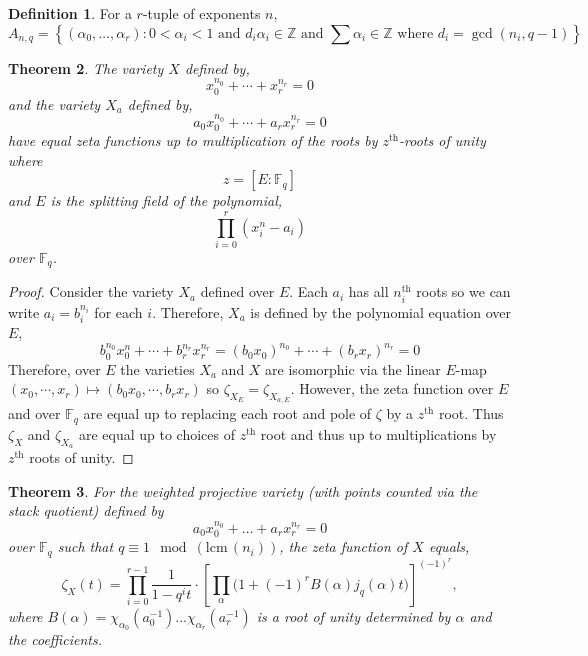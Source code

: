 \documentclass{article}
\newcommand{\Z}{\mathbb{Z}}
\newcommand{\F}{\mathbb{F}}
\newcommand{\lcm}[0]{\mathrm{lcm} \,}
\newtheorem{theorem}{Theorem}[section]
\theoremstyle{definition}
\theoremstyle{definition}
\newtheorem{definition}[theorem]{Definition}
\theoremstyle{remark}
\begin{document}
\begin{definition}
For a $r$-tuple of exponents $n$,
\[ A_{n, q} = \left\{ (\alpha_0, \dots, \alpha_r) : 0 < \alpha_i < 1 \text{ and } d_i \alpha_i \in \Z \text{ and } \sum \alpha_i \in \Z \text{ where } d_i = \gcd{(n_i, q-1)} \right\} \]
\end{definition}

\begin{theorem} \label{thm:change_coeffs}
The variety $X$ defined by,
\[ x_0^{n_0} + \cdots + x_r^{n_r} = 0 \]
and the variety $X_a$ defined by,
\[ a_0 x_0^{n_0} + \cdots + a_r x_r^{n_r} = 0 \]
have equal zeta functions up to multiplication of the roots by $z^{\mathrm{th}}$-roots of unity where \[ z = [E : \F_q] \]
and $E$ is the splitting field of the polynomial,
\[ \prod_{i = 0}^r (x^n_i - a_i) \]
over $\F_q$.
\end{theorem}

\begin{proof}
Consider the variety $X_a$ defined over $E$. Each $a_i$ has all $n_i^{\mathrm{th}}$ roots so we can write $a_i = b_i^{n_i}$ for each $i$. Therefore, $X_a$ is defined by the polynomial equation over $E$,
\[ b_0^{n_0} x^n_0 + \cdots + b_r^{n_r} x_r^{n_r} = (b_0 x_0)^{n_0} + \cdots + (b_r x_r)^{n_r} = 0 \]
Therefore, over $E$ the varieties $X_a$ and $X$ are isomorphic via the linear $E$-map $(x_0, \cdots, x_r) \mapsto (b_0 x_0, \cdots, b_r x_r)$ so $\zeta_{X_E} = \zeta_{X_{a,E}}$. However, the zeta function over $E$ and over $\F_q$ are equal up to replacing each root and pole of $\zeta$ by a $z^{\mathrm{th}}$ root. Thus $\zeta_{X}$ and $\zeta_{X_a}$ are equal up to choices of $z^{\mathrm{th}}$ root and thus up to multiplications by $z^{\mathrm{th}}$ roots of unity. 
\end{proof}

\begin{theorem} \label{thm:decomp_zeta_function}
For the weighted projective variety (with points counted via the stack quotient) defined by 
\[ a_0 x_0^{n_0} + \dots + a_r x_r^{n_r} = 0 \] 
over $\F_q$ such that $q \equiv 1 \mod (\lcm(n_i))$, the zeta function of $X$ equals, 
\[
\zeta_X(t) = \prod_{i = 0}^{r-1} \frac{1}{1 - q^i t} \cdot 
\left[ \prod_{\alpha}  \bigg( 1 + (-1)^r B(\alpha)j_q(\alpha)t \bigg) \right]^{(-1)^{r}},
\] 
where $B(\alpha) = \chi_{\alpha_0}(a_0^{-1}) \dots \chi_{\alpha_r}(a_r^{-1})$ is a root of unity determined by $\alpha$ and the coefficients.
\end{theorem} 
\end{document}
